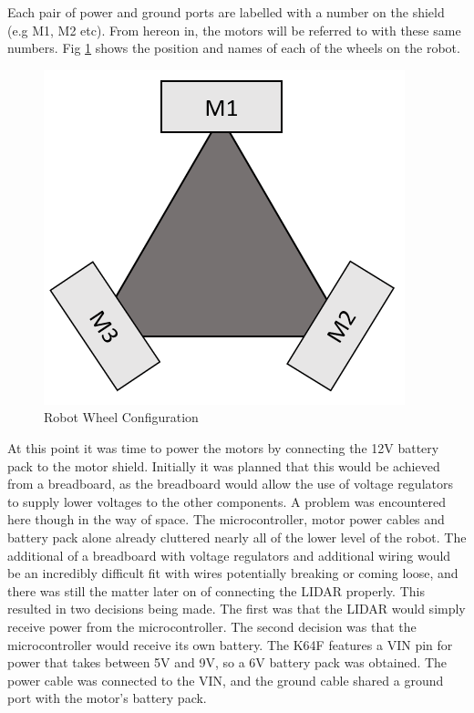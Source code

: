 				Each pair of power and ground ports are labelled with a number on the shield (e.g M1, M2 etc). From hereon in, the motors will be referred to with these same numbers. Fig \ref{fig:robotwheels} shows the position and names of each of the wheels on the robot.
				\begin{figure}[h]
					\centering
					\includegraphics[width=.5\linewidth]{SYNTHESIS/robotwheels.png}
					\caption{Robot Wheel Configuration}
					\label{fig:robotwheels}
				\end{figure}	
				
				At this point it was time to power the motors by connecting the 12V battery pack to the motor shield. Initially it was planned that this would be achieved from a breadboard, as the breadboard would allow the use of voltage regulators to supply lower voltages to the other components. A problem was encountered here though in the way of space. The microcontroller, motor power cables and battery pack alone already cluttered nearly all of the lower level of the robot. The additional of a breadboard with voltage regulators and additional wiring would be an incredibly difficult fit with wires potentially breaking or coming loose, and there was still the matter later on of connecting the LIDAR properly. This resulted in two decisions being made. The first was that the LIDAR would simply receive power from the microcontroller. The second decision was that the microcontroller would receive its own battery. The K64F features a VIN pin for power that takes between 5V and 9V, so a 6V battery pack was obtained. The power cable was connected to the VIN, and the ground cable shared a ground port with the motor's battery pack. 
				
